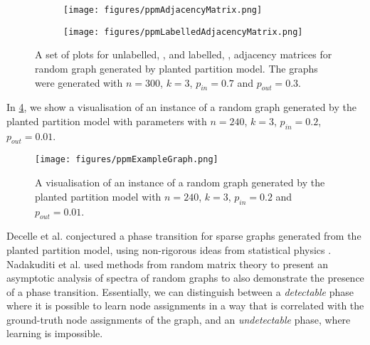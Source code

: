 \begin{figure}
	\centering
	\begin{subfigure}{.5\textwidth}
		\centering
		\texttt{[image: figures/ppmAdjacencyMatrix.png]}
		\caption{}
		\label{fig:ppmUnlabelledAdjacencyMatrixPlot}
	\end{subfigure}%
	\begin{subfigure}{.5\textwidth}
		\centering
		\texttt{[image: figures/ppmLabelledAdjacencyMatrix.png]}
		\caption{}
		\label{fig:ppmLabelledAdjacencyMatrixPlot}
	\end{subfigure}
	\caption[Plots of adjacency matrices of graph generated by planted partition model.]{\label{fig:ppmAdjacencyMatricesPlots} A set of plots for unlabelled, , and labelled, , adjacency matrices for random graph generated by planted partition model. The graphs were generated with $n = 300$, $k = 3$, $p_{in} = 0.7$ and $p_{out} = 0.3$.}
\end{figure}

In \cref{fig:ppmExampleGraph}, we show a visualisation of an instance of a random graph generated by the planted partition model with parameters with $n = 240$, $k = 3$, $p_{in} = 0.2$, $p_{out} = 0.01$.

\begin{figure}
	\centering
	\texttt{[image: figures/ppmExampleGraph.png]}
	\caption[Visualisation of a graph generated by the planted partition model.]{\label{fig:ppmExampleGraph} A visualisation of an instance of a random graph generated by the planted partition model with $n = 240$, $k = 3$, $p_{in} = 0.2$ and $p_{out} = 0.01$.}
\end{figure}

Decelle et al. \cite{DKM+11} conjectured a phase transition for sparse graphs generated from the planted partition model, using non-rigorous ideas from statistical physics \cite{MNS12}.
Nadakuditi et al. \cite{NN12} used methods from random matrix theory to present an asymptotic analysis of spectra of random graphs to also demonstrate the presence of a phase transition.
Essentially, we can distinguish between a \textit{detectable} phase where it is possible to learn node assignments in a way that is correlated with the ground-truth node assignments of the graph, and an \textit{undetectable} phase, where learning is impossible.

